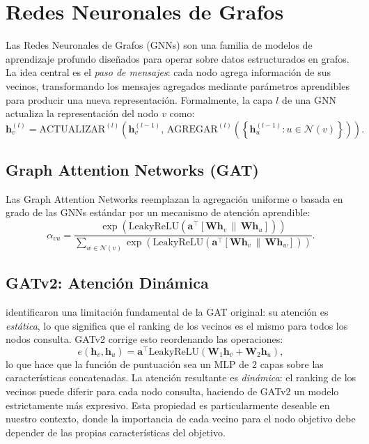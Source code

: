 \documentclass[11pt,a4paper,twoside]{tesis}
\begin{document}
\section{Redes Neuronales de Grafos}
\label{sec:gnn}

Las Redes Neuronales de Grafos (GNNs) son una familia de modelos de aprendizaje
profundo diseñados para operar sobre datos estructurados en grafos. La idea central es
el \emph{paso de mensajes}: cada nodo agrega información de sus vecinos, transformando
los mensajes agregados mediante parámetros aprendibles para producir una nueva
representación. Formalmente, la capa $l$ de una GNN actualiza la representación del
nodo $v$ como:
\[
\mathbf{h}_v^{(l)} = \mathrm{ACTUALIZAR}^{(l)}\!\left(\mathbf{h}_v^{(l-1)},\,
    \mathrm{AGREGAR}^{(l)}\!\left(\left\{\mathbf{h}_u^{(l-1)} : u \in \mathcal{N}(v)\right\}\right)\right).
\]

\subsection{Graph Attention Networks (GAT)}

Las Graph Attention Networks \cite{veličković2018graph} reemplazan la agregación
uniforme o basada en grado de las GNNs estándar por un mecanismo de atención aprendible:
\[
\alpha_{vu} = \frac{\exp\!\left(\mathrm{LeakyReLU}\!\left(\mathbf{a}^\top
    [\mathbf{W}\mathbf{h}_v \,\|\, \mathbf{W}\mathbf{h}_u]\right)\right)}
    {\sum_{w \in \mathcal{N}(v)}\exp\!\left(\mathrm{LeakyReLU}\!\left(\mathbf{a}^\top
    [\mathbf{W}\mathbf{h}_v \,\|\, \mathbf{W}\mathbf{h}_w]\right)\right)}.
\]

\subsection{GATv2: Atención Dinámica}

\textcite{brody2022how} identificaron una limitación fundamental de la GAT original:
su atención es \emph{estática}, lo que significa que el ranking de los vecinos es el
mismo para todos los nodos consulta. GATv2 corrige esto reordenando las operaciones:
\[
e(\mathbf{h}_v, \mathbf{h}_u) = \mathbf{a}^\top \mathrm{LeakyReLU}\!\left(
    \mathbf{W}_1 \mathbf{h}_v + \mathbf{W}_2 \mathbf{h}_u\right),
\]
lo que hace que la función de puntuación sea un MLP de 2 capas sobre las características
concatenadas. La atención resultante es \emph{dinámica}: el ranking de los vecinos puede
diferir para cada nodo consulta, haciendo de GATv2 un modelo estrictamente más expresivo.
Esta propiedad es particularmente deseable en nuestro contexto, donde la importancia de
cada vecino para el nodo objetivo debe depender de las propias características del
objetivo.
\end{document}
